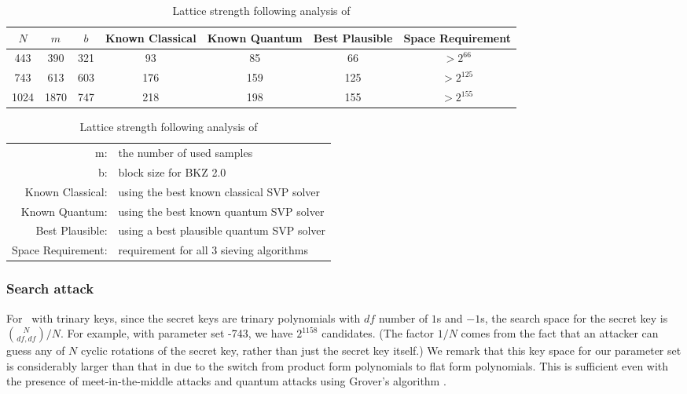 \documentclass{llncs}
\newcommand{\ntru}{{\sf{NTRU}}}
\newcommand{\<}{\langle}
\renewcommand{\>}{\rangle}
\begin{document}
\begin{table}
\centering\caption{Lattice strength following analysis of \cite{newhope}}\label{tbl:newhpe}
\begin{tabular}{|c|cc|c|c|c|c|}\hline
 $N$&  $m$ & $b$ & Known Classical & Known Quantum & Best Plausible  & Space Requirement\\\hline

443 & 390 & 321 & 93 & 85 & 66 & $>2^{66}$\\
743  & 613 & 603 & 176 & 159 & 125 & $>2^{125}$\\  
1024 & 1870 & 747 & 218 & 198 & 155 & $>2^{155}$\\\hline 
\end{tabular}

\begin{tabular} {rl}
m: & the number of used samples\\
b: & block size for BKZ 2.0\\
Known Classical: & 
using the best known classical SVP solver \\
Known Quantum: & 
using the best known quantum SVP solver \\
Best Plausible: & 
using a best plausible quantum SVP solver\\
Space Requirement: & requirement for all 3 sieving algorithms
\end{tabular}

\end{table}


\subsubsection{Search attack}
For \ntru~with trinary keys, since the secret keys are trinary polynomials with $df$ number of $1$s and $-1$s, the search space for the secret
key is ${ N \choose {df, df}}/N$. For example, with parameter set \ntru-743, we have $2^{1158}$ candidates.
(The factor $1/N$ comes from the fact that an attacker can guess any of $N$ cyclic rotations of
the secret key, rather than just the secret key itself.)
We remark that this key space for our parameter set is considerably larger than
that in \cite{param15ctrsa} due to the switch from product form polynomials to
flat form polynomials.
This is sufficient even with the presence of meet-in-the-middle attacks \cite{probupper} and quantum
attacks using Grover's algorithm \cite{Grover1996}.
\end{document}
